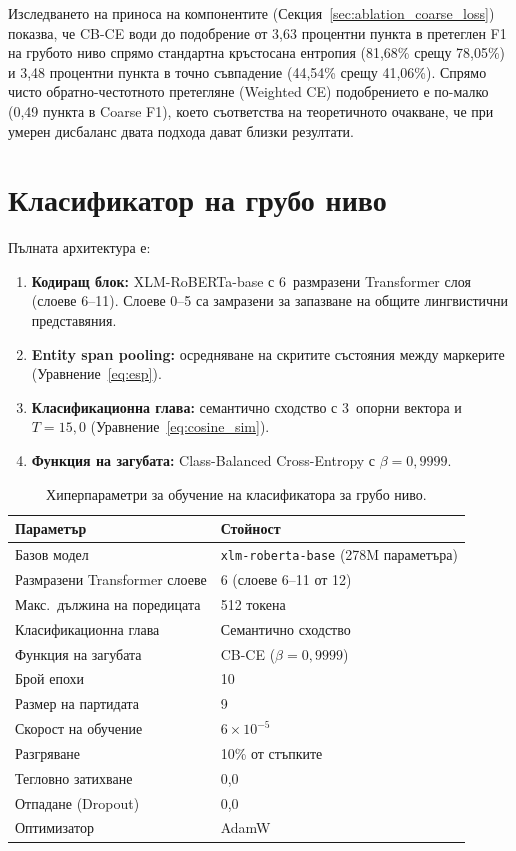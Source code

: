 \documentclass[12pt,a4paper]{report}
\begin{document}
Изследването на приноса на компонентите (Секция~\ref{sec:ablation_coarse_loss}) показва, че CB-CE води до подобрение от 3,63 процентни пункта в претеглен F1 на грубото ниво спрямо стандартна кръстосана ентропия (81,68\% срещу 78,05\%) и 3,48 процентни пункта в точно съвпадение (44,54\% срещу 41,06\%). Спрямо чисто обратно-честотното претегляне (Weighted CE) подобрението е по-малко (0,49 пункта в Coarse F1), което съответства на теоретичното очакване, че при умерен дисбаланс двата подхода дават близки резултати.


\section{Класификатор на грубо ниво}
\label{sec:coarse_classifier}

Пълната архитектура е:
\begin{enumerate}
  \item \textbf{Кодиращ блок:} XLM-RoBERTa-base с 6~размразени Transformer слоя (слоеве 6--11). Слоеве 0--5 са замразени за запазване на общите лингвистични представяния.
  \item \textbf{Entity span pooling:} осредняване на скритите състояния между маркерите (Уравнение~\ref{eq:esp}).
  \item \textbf{Класификационна глава:} семантично сходство с 3~опорни вектора и $T=15{,}0$ (Уравнение~\ref{eq:cosine_sim}).
  \item \textbf{Функция на загубата:} Class-Balanced Cross-Entropy с $\beta=0{,}9999$.
\end{enumerate}

\begin{table}[H]
\centering
\caption{Хиперпараметри за обучение на класификатора за грубо ниво.}
\label{tab:coarse_hyperparams}
\begin{tabular}{ll}
\toprule
\textbf{Параметър} & \textbf{Стойност} \\
\midrule
Базов модел & \texttt{xlm-roberta-base} (278M параметъра) \\
Размразени Transformer слоеве & 6 (слоеве 6--11 от 12) \\
Макс.\ дължина на поредицата & 512 токена \\
Класификационна глава & Семантично сходство \\
Функция на загубата & CB-CE ($\beta=0{,}9999$) \\
\midrule
Брой епохи & 10 \\
Размер на партидата & 9 \\
Скорост на обучение & $6 \times 10^{-5}$ \\
Разгряване & 10\% от стъпките \\
Тегловно затихване & 0,0 \\
Отпадане (Dropout) & 0,0 \\
Оптимизатор & AdamW \cite{loshchilov2019adamw} \\
\bottomrule
\end{tabular}
\end{table}
\end{document}
